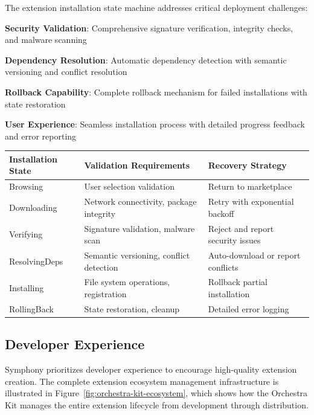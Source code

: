 The extension installation state machine addresses critical deployment challenges:

\begin{expandedlist}
    \item \textbf{Security Validation}: Comprehensive signature verification, integrity checks, and malware scanning
    \item \textbf{Dependency Resolution}: Automatic dependency detection with semantic versioning and conflict resolution
    \item \textbf{Rollback Capability}: Complete rollback mechanism for failed installations with state restoration
    \item \textbf{User Experience}: Seamless installation process with detailed progress feedback and error reporting
\end{expandedlist}

\begin{center}
\begin{tabular}{@{}lll@{}}
\toprule
\textbf{Installation State} & \textbf{Validation Requirements} & \textbf{Recovery Strategy} \\
\midrule
Browsing & User selection validation & Return to marketplace \\
Downloading & Network connectivity, package integrity & Retry with exponential backoff \\
Verifying & Signature validation, malware scan & Reject and report security issues \\
ResolvingDeps & Semantic versioning, conflict detection & Auto-download or report conflicts \\
Installing & File system operations, registration & Rollback partial installation \\
RollingBack & State restoration, cleanup & Detailed error logging \\
\bottomrule
\end{tabular}
\end{center}

\subsection*{Developer Experience}

Symphony prioritizes developer experience to encourage high-quality extension creation. The complete extension ecosystem management infrastructure is illustrated in Figure~\ref{fig:orchestra-kit-ecosystem}, which shows how the Orchestra Kit manages the entire extension lifecycle from development through distribution.

